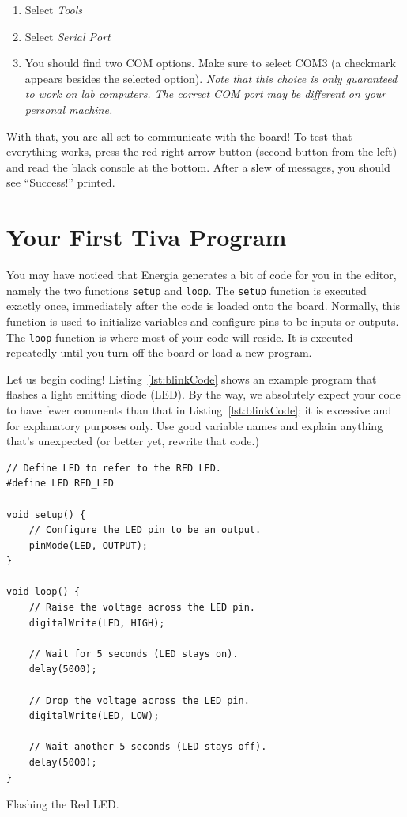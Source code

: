 \documentclass{article}
\begin{document}
\begin{enumerate}
	\item Select \emph{Tools}
	\item Select \emph{Serial Port}
	\item You should find two COM options. Make sure to select COM3 (a checkmark appears besides the selected option). \emph{Note that this choice is only guaranteed to work on lab computers. The correct COM port may be different on your personal machine.}
\end{enumerate}
With that, you are all set to communicate with the board! To test that everything works, press the red right arrow button (second button from the left) and read the black console at the bottom.  After a slew of messages, you should see ``Success!'' printed.

\section*{Your First Tiva Program}
You may have noticed that Energia generates a bit of code for you in the editor, namely the two functions \texttt{setup} and \texttt{loop}.  The \texttt{setup} function is executed exactly once, immediately after the code is loaded onto the board.  Normally, this function is used to initialize variables and configure pins to be inputs or outputs.  The \texttt{loop} function is where most of your code will reside.  It is executed repeatedly until you turn off the board or load a new program.

Let us begin coding! Listing~\ref{lst:blinkCode} shows an example program that flashes a light emitting diode (LED). By the way, we absolutely expect your code to have fewer comments than that in Listing~\ref{lst:blinkCode}; it is excessive and for explanatory purposes only. Use good variable names and explain anything that's unexpected (or better yet, rewrite that code.)

\begin{listing}[ht]
\lstset{basicstyle=\small, numbers=left, numbersep=3pt}
\begin{lstlisting}
// Define LED to refer to the RED LED.
#define LED RED_LED

void setup() {
	// Configure the LED pin to be an output.
	pinMode(LED, OUTPUT);
}

void loop() {
	// Raise the voltage across the LED pin.
	digitalWrite(LED, HIGH);

	// Wait for 5 seconds (LED stays on).
	delay(5000);

	// Drop the voltage across the LED pin.
	digitalWrite(LED, LOW);

	// Wait another 5 seconds (LED stays off).
	delay(5000);
}
\end{lstlisting}
\caption{Flashing the Red LED.}
\label{lst:blinkCode}
\end{listing}
\end{document}
